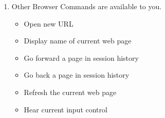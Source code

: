 \documentclass[10pt,letterpaper,twoside]{report}
\begin{document}
{\begin{enumerate}
\begin{enumerate}
\begin{itemize}
		            \end{itemize}
		      \item Other Browser Commands are available to you.
		            \begin{itemize}
			            \item Open new URL 
			            \item Display name of current web page 
			            \item Go forward a page in session history 
			            \item Go back a page in session history 
			            \item Refresh the current web page 
			            \item Hear current input control 
		            \end{itemize}
	      \end{enumerate}
\end{enumerate}

\clearpage
}
\end{document}
